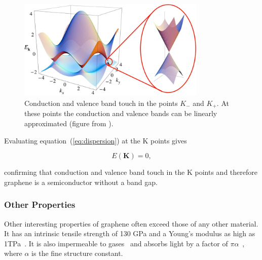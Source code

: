 \begin{figure}[!h]
  \centering
  \includegraphics[width=0.8\textwidth]{./images/dispersion.png}
  \caption { Conduction and valence band touch in the points $K_-$ and $K_+$. At these points the conduction and valence bands can be linearly approximated (figure from \cite{graphene}). }
  \label{fig:bands}
\end{figure}

Evaluating equation~(\ref{eq:dispersion}) at the K points gives

\begin{equation}
  E(\mathbf{K})=0,
\end{equation}

confirming that conduction and valence band touch in the K points and therefore graphene is a semiconductor without a band gap.

\subsubsection{Other Properties}

Other interesting properties of graphene often exceed those of any other material. It has an intrinsic tensile strength of 130 GPa and a Young's modulus as high as 1TPa~\cite{strength}. It is also impermeable to gases~\cite{Bunch2008} and absorbs light by a factor of $\pi\alpha$~\cite{optical}, where $\alpha$ is the fine structure constant.
